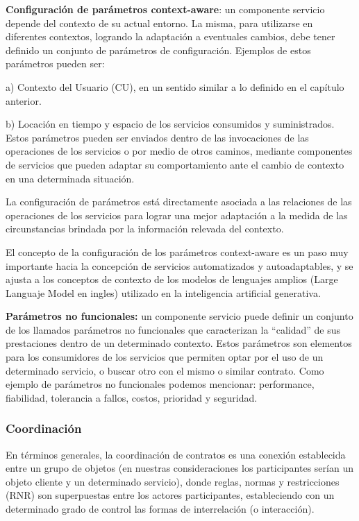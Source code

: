 \begin{itemize}
\textbf{Configuración de parámetros context-aware}: un componente servicio depende del contexto de su actual entorno. La misma, para utilizarse en diferentes contextos, logrando la adaptación a eventuales cambios, debe tener definido un conjunto de parámetros de configuración. Ejemplos de estos parámetros pueden ser: 

a) Contexto del Usuario (CU), en un sentido similar a lo definido en el capítulo anterior.

b) Locación en tiempo y espacio de los servicios consumidos y suministrados. Estos parámetros pueden ser enviados dentro de las invocaciones de las operaciones de los servicios o por medio de otros caminos, mediante componentes de servicios que pueden adaptar su comportamiento ante el cambio de contexto en una determinada situación.

La configuración de parámetros está directamente asociada a las relaciones de las operaciones de los servicios para lograr una mejor adaptación a la medida de las circunstancias brindada por la información relevada del contexto.

El concepto de la configuración de los parámetros context-aware es un paso muy importante hacia la concepción de servicios automatizados y autoadaptables, y se ajusta a los conceptos de contexto de los modelos de lenguajes amplios (Large Languaje Model en ingles) utilizado en la inteligencia artificial generativa.

\textbf{Parámetros no funcionales:} un componente servicio puede definir un conjunto de los llamados parámetros no funcionales que caracterizan la “calidad” de sus prestaciones dentro de un determinado contexto. Estos parámetros son elementos para los consumidores de los servicios que permiten optar por el uso de un determinado servicio, o buscar otro con el mismo o similar contrato. Como ejemplo de parámetros no funcionales podemos mencionar: performance, fiabilidad, tolerancia a fallos, costos, prioridad y seguridad.

\subsubsection {Coordinación}

En términos generales, la coordinación de contratos es una conexión establecida
entre un grupo de objetos (en nuestras consideraciones los participantes
serían un objeto cliente y un determinado servicio), donde reglas, normas y
restricciones (RNR) son superpuestas entre los actores participantes, estableciendo
con un determinado grado de control las formas de interrelación (o
interacción).


\end{itemize}
